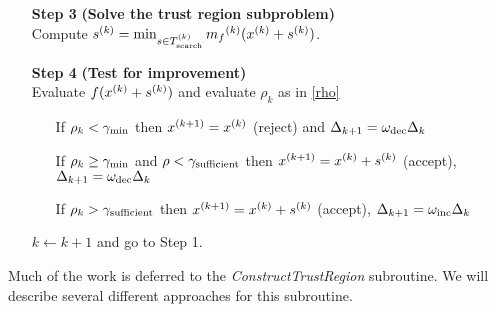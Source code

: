 \begin{algorithm}[H]
\begin{itemize}
        \item[\textbf{Step 3}] \textbf{(Solve the trust region subproblem)} \\
            Compute ${{s}^{(k)}} = \min_{s \in {T_{\text{search}}^{(k)}}} {{m}_f}^{(k)}({x}^{(k)} + {{s}^{(k)}})$.
            
        \item[\textbf{Step 4}] \textbf{(Test for improvement)} \\
            Evaluate $f({x}^{(k)} + {{s}^{(k)}})$ and evaluate $\rho_k$ as in \cref{rho} \begin{itemize}
                \item[] If $\rho_k < \gamma_{\text{min}}$ then ${x}^{(k+1)}={x}^{(k)}$ (reject) and $\Delta_{k+1} = \omega_{\text{dec}}\Delta_{k}$
                \item[] If $\rho_k \ge \gamma_{\text{min}}$ and $\rho < \gamma_{\text{sufficient}}$ then ${x}^{(k+1)}={x}^{(k)}+{{s}^{(k)}}$ (accept), $\Delta_{k+1} = \omega_{\text{dec}}\Delta_{k}$
                \item[] If $\rho_k > \gamma_{\text{sufficient}}$ then ${x}^{(k+1)}={x}^{(k)}+{{s}^{(k)}}$ (accept), $\Delta_{k+1} = \omega_{\text{inc}}\Delta_{k}$
            \end{itemize}
            $k \gets k+1$ and go to Step 1.
    \end{itemize}
\end{algorithm}

 

Much of the work is deferred to the \emph{ConstructTrustRegion} subroutine.
We will describe several different approaches for this subroutine.



